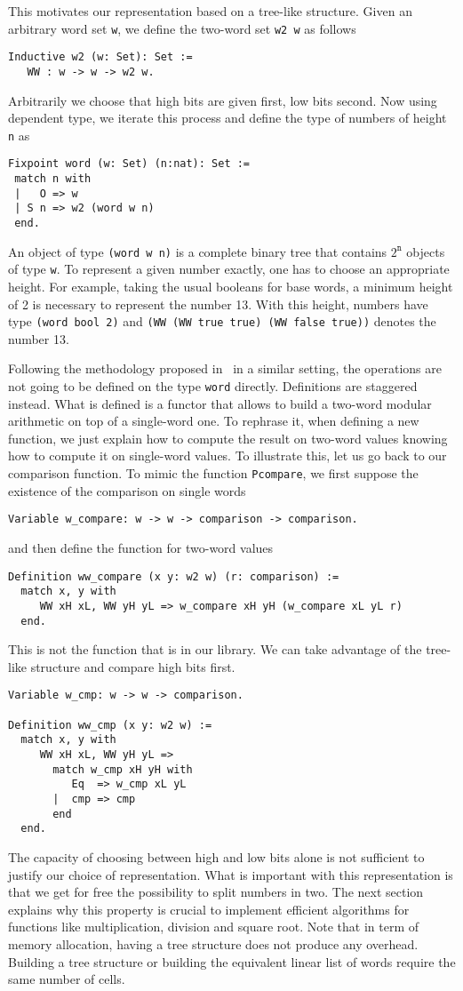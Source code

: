 This motivates our representation based on a tree-like structure. Given an arbitrary word set {\tt w}, we define
the two-word set {\tt w2 w} as follows 
\begin{verbatim}
Inductive w2 (w: Set): Set :=  
   WW : w -> w -> w2 w.
\end{verbatim}
Arbitrarily we choose that high bits are given first, low bits
second. Now using dependent type, we iterate this process and define
the type of numbers of height {\tt n} as
\begin{verbatim}
Fixpoint word (w: Set) (n:nat): Set :=
 match n with
 |   O => w
 | S n => w2 (word w n)
 end.
\end{verbatim}
An object of type {\tt (word w n)} is a complete binary tree that
contains $2^\texttt{n}$ objects of type {\tt w}.
To represent a given number exactly, one has to choose an appropriate height.
For example, taking the usual booleans for base words, a minimum
height of 2 is necessary to represent the number 13. With this height, 
numbers have type {\tt (word bool 2)} and 
{\tt (WW (WW true true) (WW false true))} denotes the number 13.

Following the methodology proposed in~\cite{GreMa} in a similar setting, 
the operations are not going to be defined on the type {\tt word} directly.
Definitions are staggered instead. What is defined is a functor that 
allows to build a two-word modular arithmetic on top of a single-word one. To rephrase it,
when defining a new function, we just explain how to compute the 
result on two-word values knowing how to compute it on single-word values.
To illustrate this, let us go back to our comparison function. 
To mimic the function {\tt Pcompare}, we first suppose the existence
of the comparison on single words
\begin{verbatim}
Variable w_compare: w -> w -> comparison -> comparison.
\end{verbatim}
and then define the function for two-word values
\begin{verbatim}
Definition ww_compare (x y: w2 w) (r: comparison) :=
  match x, y with
     WW xH xL, WW yH yL => w_compare xH yH (w_compare xL yL r) 
  end.
\end{verbatim}
This is not the function that is in our library. We can take 
advantage of the tree-like structure and compare high bits first.  
\begin{verbatim}
Variable w_cmp: w -> w -> comparison.

Definition ww_cmp (x y: w2 w) :=
  match x, y with
     WW xH xL, WW yH yL => 
       match w_cmp xH yH with 
          Eq  => w_cmp xL yL
       |  cmp => cmp
       end
  end. 
\end{verbatim}
The capacity of choosing between high and low bits alone is
not sufficient to justify our choice of representation. What
is important with this representation is that we get for free
the possibility to split numbers in two. The next section 
explains why this property is crucial to implement efficient
algorithms for functions like multiplication, division and square root.
Note that in term of memory allocation, having a tree structure
does not produce any overhead. Building a tree structure or 
building the equivalent linear list of words require the same number of cells.

